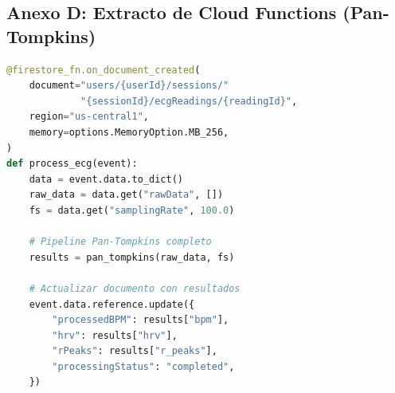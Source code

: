 \documentclass[letterpaper,11pt]{article}
\begin{document}
\subsection{Anexo D: Extracto de Cloud Functions (Pan-Tompkins)}

\begin{lstlisting}[caption={Trigger de procesamiento de ECG en Cloud Functions.}, label={lst:ecg_cloud}, language=Python]
@firestore_fn.on_document_created(
    document="users/{userId}/sessions/"
             "{sessionId}/ecgReadings/{readingId}",
    region="us-central1",
    memory=options.MemoryOption.MB_256,
)
def process_ecg(event):
    data = event.data.to_dict()
    raw_data = data.get("rawData", [])
    fs = data.get("samplingRate", 100.0)

    # Pipeline Pan-Tompkins completo
    results = pan_tompkins(raw_data, fs)

    # Actualizar documento con resultados
    event.data.reference.update({
        "processedBPM": results["bpm"],
        "hrv": results["hrv"],
        "rPeaks": results["r_peaks"],
        "processingStatus": "completed",
    })
\end{lstlisting}
\end{document}

